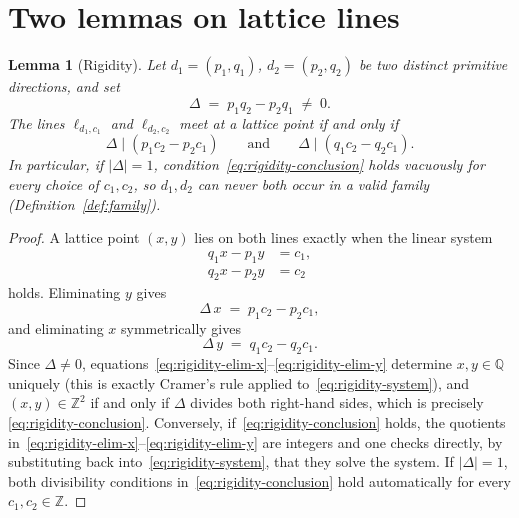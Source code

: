 \documentclass[a4paper,11pt,oneside,reqno]{amsart}
\theoremstyle{definition}
\theoremstyle{remark}
\theoremstyle{plain}
\newtheorem{lemma}[definition]{Lemma}
\newcommand{\Z}{\mathbb{Z}}
\begin{document}
\section{Two lemmas on lattice lines}

\begin{lemma}[Rigidity]
  \label{lem:rigidity}
  Let \(d_1=(p_1,q_1)\), \(d_2=(p_2,q_2)\) be \emph{two} distinct primitive directions, and set
  \begin{equation}
    \label{eq:Delta-def}
    \Delta \;=\; p_1q_2-p_2q_1 \;\ne\; 0.
  \end{equation}
  The lines \(\ell_{d_1,c_1}\) and \(\ell_{d_2,c_2}\) meet at a lattice point if and only if
  \begin{equation}
    \label{eq:rigidity-conclusion}
    \tag{R}
    \Delta \mid (p_1c_2-p_2c_1) \qquad\text{and}\qquad \Delta \mid (q_1c_2-q_2c_1).
  \end{equation}
  In particular, if \(|\Delta|=1\), condition~\eqref{eq:rigidity-conclusion} holds vacuously for
  \emph{every} choice of \(c_1,c_2\), so \(d_1,d_2\) can never both occur in a valid family
  (Definition~\ref{def:family}).
\end{lemma}

\begin{proof}
  A lattice point \((x,y)\) lies on both lines exactly when the linear system
  \begin{equation}
    \label{eq:rigidity-system}
    \begin{aligned}
      q_1x - p_1y &= c_1, \\
      q_2x - p_2y &= c_2
    \end{aligned}
  \end{equation}
  holds. Eliminating \(y\) gives
  \begin{equation}
    \label{eq:rigidity-elim-x}
    \Delta\, x \;=\; p_1c_2 - p_2c_1,
  \end{equation}
  and eliminating \(x\) symmetrically gives
  \begin{equation}
    \label{eq:rigidity-elim-y}
    \Delta\, y \;=\; q_1c_2 - q_2c_1.
  \end{equation}
  Since \(\Delta\ne0\), equations~\eqref{eq:rigidity-elim-x}--\eqref{eq:rigidity-elim-y} determine
  \(x,y\in\mathbb Q\) uniquely (this is exactly Cramer's rule applied to~\eqref{eq:rigidity-system}),
  and \((x,y)\in\Z^2\) if and only if \(\Delta\) divides both right-hand sides, which is precisely
  \eqref{eq:rigidity-conclusion}. Conversely, if~\eqref{eq:rigidity-conclusion} holds, the
  quotients in~\eqref{eq:rigidity-elim-x}--\eqref{eq:rigidity-elim-y} are integers and one checks
  directly, by substituting back into~\eqref{eq:rigidity-system}, that they solve the system. If
  \(|\Delta|=1\), both
  divisibility conditions in~\eqref{eq:rigidity-conclusion} hold automatically for every
  \(c_1,c_2\in\Z\).
\end{proof}
\end{document}
